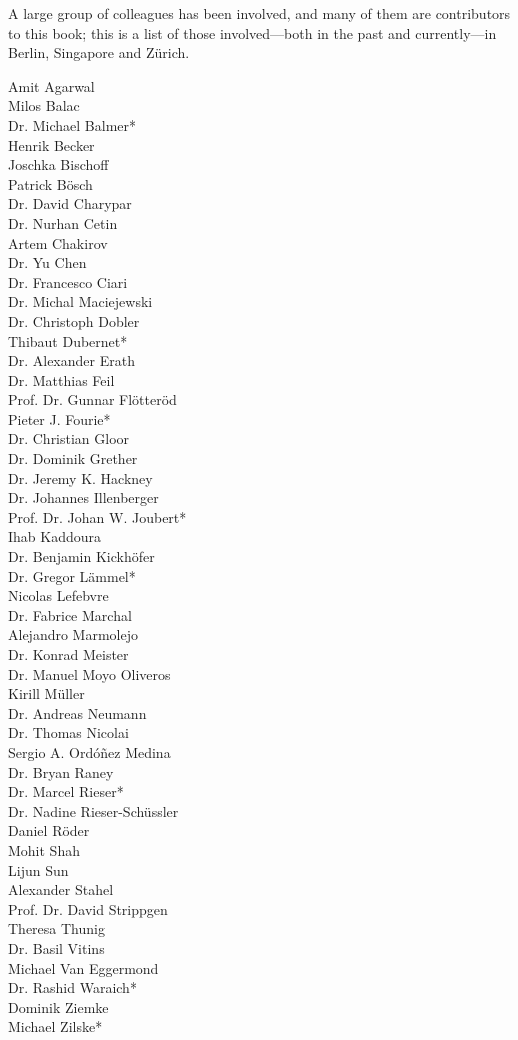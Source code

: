 A large group of colleagues has been involved, and many of them are contributors to this book; this is a list of those involved---both in the past and currently---in Berlin, Singapore and Zürich.  
%
\begin{multicols}{3}
Amit Agarwal \\
Milos Balac  \\
Dr. Michael Balmer\mbox{*} \\
Henrik Becker \\
Joschka Bischoff \\
Patrick Bösch \\
Dr. David Charypar \\
Dr. Nurhan Cetin  \\
Artem Chakirov \\
Dr. Yu Chen \\
Dr. Francesco Ciari \\
Dr. Michal Maciejewski \\
Dr. Christoph Dobler \\
Thibaut Dubernet\mbox{*} \\
Dr. Alexander Erath \\
Dr. Matthias Feil \\
Prof. Dr. Gunnar Flötteröd \\
Pieter J. Fourie\mbox{*} \\
Dr. Christian Gloor \\
Dr. Dominik Grether \\
Dr. Jeremy K. Hackney \\
Dr. Johannes Illenberger \\
Prof. Dr. Johan W. Joubert\mbox{*} \\
Ihab Kaddoura \\
Dr. Benjamin Kickhöfer \\
Dr. Gregor Lämmel\mbox{*} \\
Nicolas Lefebvre \\
Dr. Fabrice Marchal \\
Alejandro Marmolejo \\
Dr. Konrad Meister \\
Dr. Manuel Moyo Oliveros \\
Kirill Müller \\
Dr. Andreas Neumann \\
Dr. Thomas Nicolai \\
Sergio A. Ordóñez Medina \\
Dr. Bryan Raney \\
Dr. Marcel Rieser\mbox{*} \\
Dr. Nadine Rieser-Schüssler \\
Daniel Röder \\
Mohit Shah \\
Lijun Sun \\
Alexander Stahel \\
Prof. Dr. David Strippgen \\
Theresa Thunig \\
Dr. Basil Vitins \\
Michael Van Eggermond \\
Dr. Rashid Waraich\mbox{*} \\
Dominik Ziemke \\
Michael Zilske\mbox{*} \\
\end{multicols}

